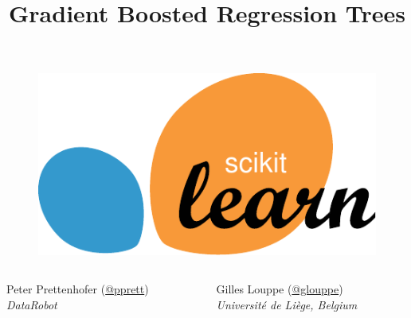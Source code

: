 \documentclass[a4paper,presentation]{beamer}
\title{Gradient Boosted Regression Trees}
\date{}
\begin{document}

\begin{frame}

\titlepage

\vspace{-3cm}

\begin{figure}
  \centering
    \includegraphics[scale=.6]{./images/scikit-learn-logo.pdf}
\end{figure}

\vspace{1cm}

\begin{columns}[T]
\begin{column}{.48\textwidth}

\centering
Peter Prettenhofer (\href{https://twitter.com/pprett}{@pprett})\\
{\small\it DataRobot}

\end{column}
\begin{column}{.48\textwidth}

\centering
Gilles Louppe (\href{https://twitter.com/glouppe}{@glouppe})\\
{\small\it Université de Liège, Belgium}

\end{column}
\end{columns}


\end{frame}


\end{document}
